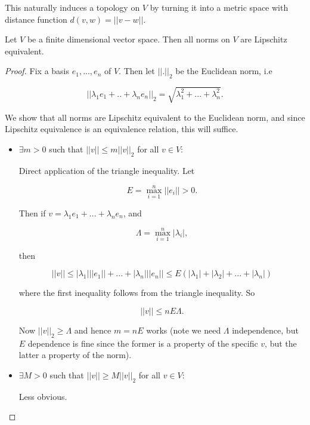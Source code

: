 \documentclass[11pt]{scrartcl}
\begin{document}
\begin{remark}
This naturally induces a topology on $V$ by turning it into a metric space with distance function $d(v,w) = ||v-w||$.
\end{remark}

\begin{theorem}

Let $V$ be a finite dimensional vector space. Then all norms on $V$ are Lipschitz equivalent.

\begin{proof}

Fix a basis $e_1, ... , e_n$ of $V$. Then let $||.||_2$ be the Euclidean norm, i.e

\begin{equation}
    ||\lambda_1 e_1 + .. + \lambda_n e_n||_2 = \sqrt{ \lambda_1^2 + ... + \lambda_n^2 }.
\end{equation}

We show that all norms are Lipschitz equivalent to the Euclidean norm, and since Lipschitz equivalence is an equivalence relation, this will suffice.

\begin{itemize}
    \item $\exists m > 0$ such that $||v|| \le m ||v||_2$ for all $v \in V$:
    
    Direct application of the triangle inequality. Let 

    \begin{equation}
        E = \max_{i=1}^n ||e_i|| > 0.
    \end{equation}

    Then if $v = \lambda_1 e_1 + ... + \lambda_n e_n$, and

    \begin{equation}
        \Lambda = \max_{i=1}^n |\lambda_i|,
    \end{equation}

    then 

    \begin{equation}
        ||v|| \le |\lambda_1| ||e_1|| + ... + |\lambda_n| ||e_n|| \le E (|\lambda_1| + |\lambda_2| + ... + |\lambda_n|)
    \end{equation}

    where the first inequality follows from the triangle inequality. So

    \begin{equation}
        ||v|| \le nE\Lambda.
    \end{equation}

    Now $||v||_2 \ge \Lambda$ and hence $m = nE$ works (note we need $\Lambda$ independence, but $E$ dependence is fine since the former is a property of the specific $v$, but the latter a property of the norm).

    \item $\exists M > 0$ such that $||v|| \ge M ||v||_2$ for all $v \in V$:
    
    Less obvious.

\end{itemize}
\end{proof}
\end{theorem}
\end{document}
